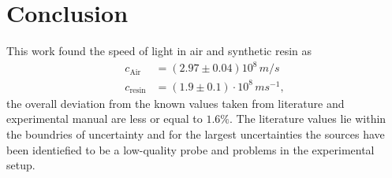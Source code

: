 \section{Conclusion}
\label{sec:conclusion}
This work found the speed of light in air and synthetic resin as
\begin{align}
  c_\text{Air} &= (2.97 \pm 0.04) 10^8 \, \si{m/s} \\
  c_\text{resin} &= (1.9 \pm 0.1) \cdot 10^8 \, \si{ms^{-1}},
\end{align}
the overall deviation from the known values taken from literature and experimental manual are less
or equal to $1.6\%$. The literature values lie within the boundries of uncertainty and for the
largest uncertainties the sources have been identiefied to be a low-quality probe and problems in
the experimental setup.

